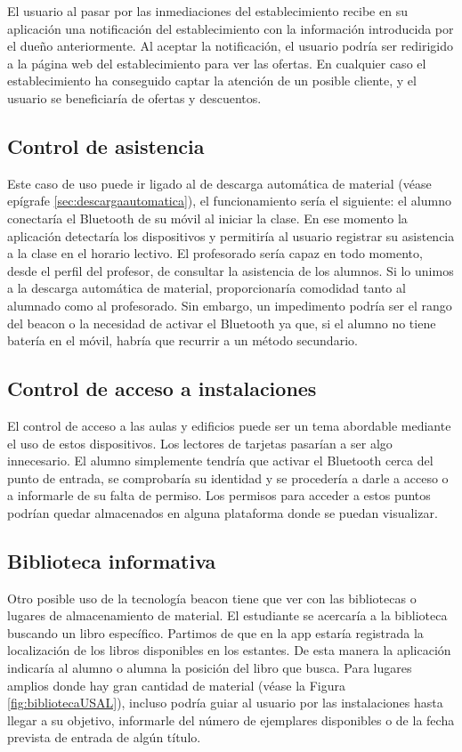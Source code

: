 El usuario al pasar por las inmediaciones del establecimiento recibe en su aplicación una notificación del establecimiento con la información introducida por el dueño anteriormente. Al aceptar la notificación, el usuario podría ser redirigido a la página web del establecimiento para ver las ofertas. En cualquier caso el establecimiento ha conseguido captar la atención de un posible cliente, y el usuario se beneficiaría de ofertas y descuentos. 

\subsection{Control de asistencia}

Este caso de uso puede ir ligado al de descarga automática de material (véase epígrafe \ref{sec:descargaautomatica}), el funcionamiento sería el siguiente: el alumno conectaría el Bluetooth de su móvil al iniciar la clase. En ese momento la aplicación detectaría los dispositivos y permitiría al usuario registrar su asistencia a la clase en el horario lectivo. El profesorado sería capaz en todo momento, desde el perfil del profesor, de consultar la asistencia de los alumnos. Si lo unimos a la descarga automática de material, proporcionaría comodidad tanto al alumnado como al profesorado. Sin embargo, un impedimento podría ser el rango del beacon o la necesidad de activar el Bluetooth ya que, si el alumno no tiene batería en el móvil, habría que recurrir a un método secundario. 

\subsection{Control de acceso a instalaciones}

El control de acceso a las aulas y edificios puede ser un tema abordable mediante el uso de estos dispositivos. Los lectores de tarjetas pasarían a ser algo innecesario. El alumno simplemente tendría que activar el Bluetooth cerca del punto de entrada, se comprobaría su identidad y se procedería a darle a acceso o a informarle de su falta de permiso. Los permisos para acceder a estos puntos podrían quedar almacenados en alguna plataforma donde se puedan visualizar.

\subsection{Biblioteca informativa}

Otro posible uso de la tecnología beacon tiene que ver con las bibliotecas o lugares de almacenamiento de material. El estudiante se acercaría a la biblioteca buscando un libro específico. Partimos de que en la app estaría registrada la localización de los libros disponibles en los estantes. De esta manera la aplicación indicaría al alumno o alumna la posición del libro que busca. Para lugares amplios donde hay gran cantidad de material (véase la Figura \ref{fig:bibliotecaUSAL}), incluso podría guiar al usuario por las instalaciones hasta llegar a su objetivo, informarle del número de ejemplares disponibles o de la fecha prevista de entrada de algún título.

